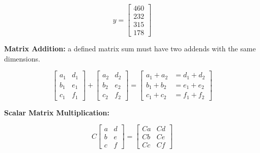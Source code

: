 \documentclass{article}
\begin{document}
        \begin{equation*}
            y = \begin{bmatrix}
                    460 \\
                    232 \\
                    315 \\
                    178
                \end{bmatrix}
        \end{equation*}

        \noindent \textbf{Matrix Addition:} a defined matrix sum must have two addends with the same dimensions.

        \begin{equation*}
            \begin{bmatrix}
                a_1 & d_1 \\
                b_1 & e_1 \\
                c_1 & f_1
            \end{bmatrix}
            +
            \begin{bmatrix}
                a_2 & d_2 \\
                b_2 & e_2 \\
                c_2 & f_2
            \end{bmatrix}
            =
            \begin{bmatrix}
                a_1 + a_2   &= d_1 + d_2 \\
                b_1 + b_2   &= e_1 + e_2 \\
                c_1 + c_2   &= f_1 + f_2
            \end{bmatrix}
        \end{equation*}

        \noindent \textbf{Scalar Matrix Multiplication:}

        \begin{equation*}
            C   \begin{bmatrix}
                    a & d \\
                    b & e \\
                    c & f
                \end{bmatrix}
            =
                \begin{bmatrix}
                    Ca & Cd \\
                    Cb & Ce \\
                    Cc & Cf
                \end{bmatrix}
        \end{equation*}
\end{document}
